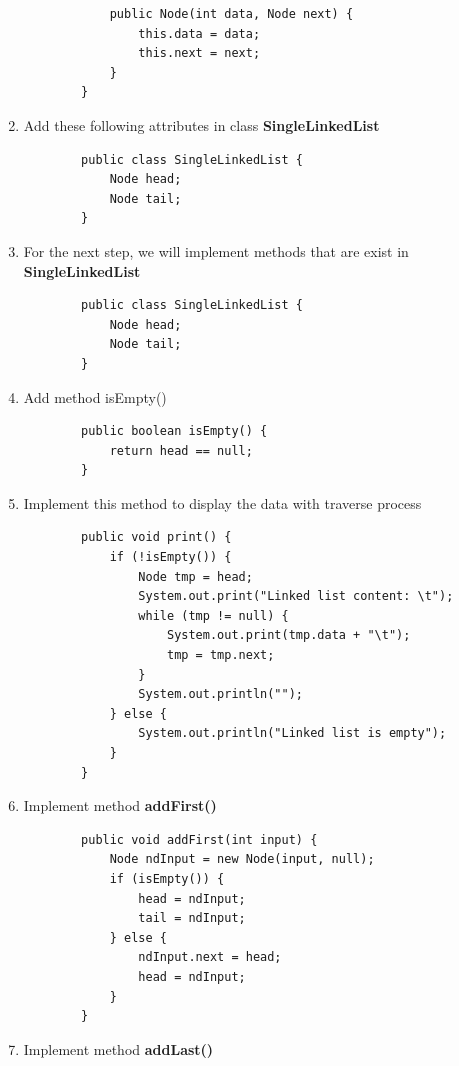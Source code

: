 \documentclass[12pt,titlepage]{article}
\begin{document}
\begin{enumerate}
\begin{verbatim}
            public Node(int data, Node next) {
                this.data = data;
                this.next = next;
            }
        }
    \end{verbatim}
    \item Add these following attributes in class \textbf{SingleLinkedList}
    \begin{verbatim}
        public class SingleLinkedList {
            Node head;
            Node tail;
        }
    \end{verbatim}
    \item For the next step, we will implement methods that are exist in \textbf{SingleLinkedList}
    \begin{verbatim}
        public class SingleLinkedList {
            Node head;
            Node tail;
        }
    \end{verbatim}
    \item Add method isEmpty()
    \begin{verbatim}
        public boolean isEmpty() {
            return head == null;
        }
    \end{verbatim}
    \item Implement this method to display the data with traverse process
    \begin{verbatim}
        public void print() {
            if (!isEmpty()) {
                Node tmp = head;
                System.out.print("Linked list content: \t");
                while (tmp != null) {
                    System.out.print(tmp.data + "\t");
                    tmp = tmp.next;
                }
                System.out.println("");
            } else {
                System.out.println("Linked list is empty");
            }
        }
    \end{verbatim}
    \item Implement method \textbf{addFirst()}
    \begin{verbatim}
        public void addFirst(int input) {
            Node ndInput = new Node(input, null);
            if (isEmpty()) {
                head = ndInput;
                tail = ndInput;
            } else {
                ndInput.next = head;
                head = ndInput;
            }
        }
    \end{verbatim}
    \item Implement method \textbf{addLast()}
    \begin{verbatim}

\end{verbatim}
\end{enumerate}
\end{document}
